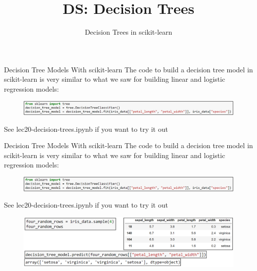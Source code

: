 \documentclass[aspectratio=169]{../latex_main/tntbeamer}  %
\title[Introduction]{DS: Decision Trees}
\subtitle{Decision Trees in scikit-learn}
\begin{document}
	
	\maketitle
	\begin{frame}{Decision Tree Models With scikit-learn }
	    The code to build a decision tree model in scikit-learn is very similar to what we saw for building linear and logistic regression models:
	    \begin{figure}
	        \centering
	        \includegraphics[scale=.6]{Bild17}
	    \end{figure}
	    See lec20-decision-trees.ipynb if you want to try it out
	\end{frame}
	
	
	
	\begin{frame}{Decision Tree Models With scikit-learn }
	    The code to build a decision tree model in scikit-learn is very similar to what we saw for building linear and logistic regression models:
	    \begin{figure}
	        \centering
	        \includegraphics[scale=.6]{Bild17}
	    \end{figure}
	    See lec20-decision-trees.ipynb if you want to try it out
        \begin{figure}
            \centering
            \includegraphics[scale=.4]{Bild18}
        \end{figure}
	\end{frame}
	
\end{document}
